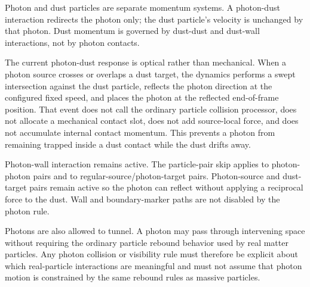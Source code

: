 Photon and dust particles are separate momentum systems.  A photon-dust
interaction redirects the photon only; the dust particle's velocity is
unchanged by that photon.  Dust momentum is governed by dust-dust and dust-wall
interactions, not by photon contacts.

The current photon-dust response is optical rather than mechanical.  When a
photon source crosses or overlaps a dust target, the dynamics performs a swept
intersection against the dust particle, reflects the photon direction at the
configured fixed speed, and places the photon at the reflected end-of-frame
position.  That event does not call the ordinary particle collision processor,
does not allocate a mechanical contact slot, does not add source-local force,
and does not accumulate internal contact momentum.  This prevents a photon from
remaining trapped inside a dust contact while the dust drifts away.

Photon-wall interaction remains active.  The particle-pair skip applies to
photon-photon pairs and to regular-source/photon-target pairs.  Photon-source
and dust-target pairs remain active so the photon can reflect without applying
a reciprocal force to the dust.  Wall and boundary-marker paths are not
disabled by the photon rule.

Photons are also allowed to tunnel.  A photon may pass through intervening
space without requiring the ordinary particle rebound behavior used by real
matter particles.  Any photon collision or visibility rule must therefore be
explicit about which real-particle interactions are meaningful and must not
assume that photon motion is constrained by the same rebound rules as massive
particles.
